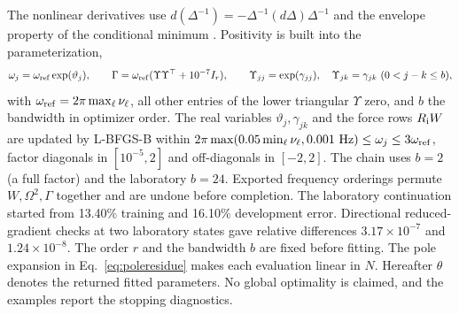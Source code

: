 The nonlinear derivatives use $d(\Delta^{-1})=-\Delta^{-1}(d\Delta)\Delta^{-1}$
and the envelope property of the conditional minimum \citep{golub2003,oleary2013}.
Positivity is built into the parameterization,
\begin{equation}
 \omega_j=\omega_{\rm ref}\exp(\vartheta_j),\qquad
 \Gamma=\omega_{\rm ref}(\Upsilon\Upsilon^{\top}+10^{-7}I_r),\qquad
 \Upsilon_{jj}=\exp(\gamma_{jj}),\quad
 \Upsilon_{jk}=\gamma_{jk}\ (0<j-k\le b),
 \label{eq:positive}
\end{equation}
with $\omega_{\rm ref}=2\pi\max_\ell\nu_\ell$, all other entries of the lower
triangular $\Upsilon$ zero, and $b$ the bandwidth in optimizer order. The
real variables $\vartheta_j,\gamma_{jk}$ and the force rows $R_{\rm i}W$ are
updated by L-BFGS-B \citep{byrd1995} within
$2\pi\max(0.05\min_\ell\nu_\ell,0.001\ \mathrm{Hz})\le\omega_j\le3\omega_{\rm ref}$,
factor diagonals in $[10^{-5},2]$ and off-diagonals in $[-2,2]$. The chain
uses $b=2$ (a full factor) and the laboratory $b=24$. Exported frequency
orderings permute $W,\Omega^{2},\Gamma$ together and are undone before
completion. The laboratory continuation started from 13.40\% training and
16.10\% development error. Directional reduced-gradient checks at two
laboratory states gave relative differences $3.17\times10^{-7}$ and
$1.24\times10^{-8}$. The order $r$ and the bandwidth $b$ are fixed before
fitting. The pole expansion in Eq.~\eqref{eq:poleresidue} makes each
evaluation linear in $N$. Hereafter $\theta$ denotes the returned fitted
parameters. No global optimality is claimed, and the examples report the
stopping diagnostics.

